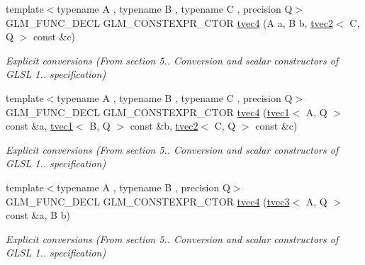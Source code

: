 \begin{DoxyCompactItemize}
\mbox{\label{structglm_1_1tvec4_a54ad572a422fa13b5e17c2f0a0e85b86}} 
{\footnotesize template$<$typename A , typename B , typename C , precision Q$>$ }\\G\+L\+M\+\_\+\+F\+U\+N\+C\+\_\+\+D\+E\+CL G\+L\+M\+\_\+\+C\+O\+N\+S\+T\+E\+X\+P\+R\+\_\+\+C\+T\+OR \hyperlink{structglm_1_1tvec4_a54ad572a422fa13b5e17c2f0a0e85b86}{tvec4} (A a, B b, \hyperlink{structglm_1_1tvec2}{tvec2}$<$ C, Q $>$ const \&c)
\begin{DoxyCompactList}\small\item\em Explicit conversions (From section 5.. Conversion and scalar constructors of G\+L\+SL 1.. specification) \end{DoxyCompactList}\item 
\mbox{\label{structglm_1_1tvec4_a71e8bea6cf92f6f3f1b394959b46b9a9}} 
{\footnotesize template$<$typename A , typename B , typename C , precision Q$>$ }\\G\+L\+M\+\_\+\+F\+U\+N\+C\+\_\+\+D\+E\+CL G\+L\+M\+\_\+\+C\+O\+N\+S\+T\+E\+X\+P\+R\+\_\+\+C\+T\+OR \hyperlink{structglm_1_1tvec4_a71e8bea6cf92f6f3f1b394959b46b9a9}{tvec4} (\hyperlink{structglm_1_1tvec1}{tvec1}$<$ A, Q $>$ const \&a, \hyperlink{structglm_1_1tvec1}{tvec1}$<$ B, Q $>$ const \&b, \hyperlink{structglm_1_1tvec2}{tvec2}$<$ C, Q $>$ const \&c)
\begin{DoxyCompactList}\small\item\em Explicit conversions (From section 5.. Conversion and scalar constructors of G\+L\+SL 1.. specification) \end{DoxyCompactList}\item 
\mbox{\label{structglm_1_1tvec4_abf6fb7c4a9dcaba61d1a898c86ed4a3b}} 
{\footnotesize template$<$typename A , typename B , precision Q$>$ }\\G\+L\+M\+\_\+\+F\+U\+N\+C\+\_\+\+D\+E\+CL G\+L\+M\+\_\+\+C\+O\+N\+S\+T\+E\+X\+P\+R\+\_\+\+C\+T\+OR \hyperlink{structglm_1_1tvec4_abf6fb7c4a9dcaba61d1a898c86ed4a3b}{tvec4} (\hyperlink{structglm_1_1tvec3}{tvec3}$<$ A, Q $>$ const \&a, B b)
\begin{DoxyCompactList}\small\item\em Explicit conversions (From section 5.. Conversion and scalar constructors of G\+L\+SL 1.. specification) \end{DoxyCompactList}\item 

\end{DoxyCompactItemize}
